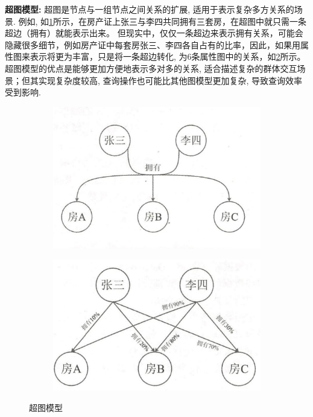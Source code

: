 \textbf{超图模型:} 超图是节点与一组节点之间关系的扩展, 适用于表示复杂多方关系的场景. 例如, 如\cref{fig:hypergraph1}所示，在房产证上张三与李四共同拥有三套房，在超图中就只需一条超边（拥有）就能表示出来。 但现实中，仅仅一条超边来表示拥有关系，可能会隐藏很多细节，例如房产证中每套房张三、李四各自占有的比率，因此，如果用属性图来表示将更为丰富，只是将一条超边转化, 为6条属性图中的关系，如\cref{fig:hypergraph2}所示。超图模型的优点是能够更加方便地表示多对多的关系, 适合描述复杂的群体交互场景；但其实现复杂度较高, 查询操作也可能比其他图模型更加复杂, 导致查询效率受到影响.
\begin{figure}[H]
	\centering
	\begin{subfigure}[b]{0.45\textwidth}
		\centering
		\includegraphics[width=1\textwidth]{images/16.png}
		\label{fig:hypergraph1}
	\end{subfigure}
	\begin{subfigure}[b]{0.45\textwidth}
		\centering
		\includegraphics[width=1\textwidth]{images/17.png}
		\label{fig:hypergraph2}
	\end{subfigure}
	\caption{超图模型}
	\label{fig:hypergraph}
\end{figure}



